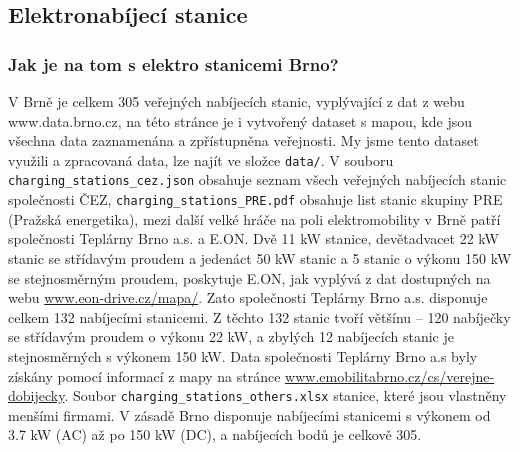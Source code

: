 \documentclass[a4paper,11pt]{article}
\begin{document}
\subsection{Elektronabíjecí stanice}

\subsubsection{Jak je na tom s elektro stanicemi Brno?}
\label{sec:stanice}
V Brně je celkem 305 veřejných nabíjecích stanic, vyplývající z dat z webu www.data.brno.cz\cite{data_brno},
na této stránce je i vytvořený dataset s mapou, kde jsou všechna data zaznamenána a zpřístupněna veřejnosti.
My jsme tento dataset využili a zpracovaná data, lze najít ve složce \texttt{data/}. V souboru \texttt{charging\_stations\_cez.json}
obsahuje seznam všech veřejných nabíjecích stanic společnosti ČEZ, \texttt{charging\_stations\_PRE.pdf} obsahuje
list stanic skupiny PRE (Pražská energetika), mezi další velké hráče na poli elektromobility v Brně patří společnosti
Teplárny Brno a.s. a E.ON. Dvě 11 kW stanice, devětadvacet 22 kW stanic se střídavým proudem a jedenáct 50 kW stanic 
a 5 stanic o výkonu 150 kW se stejnosměrným proudem, poskytuje E.ON, jak vyplývá z dat dostupných na webu 
\href{https://www.eon-drive.cz/mapa/}{www.eon-drive.cz/mapa/}. Zato společnosti Teplárny Brno a.s. disponuje celkem 
132 nabíjecími stanicemi. Z těchto 132 stanic tvoří většínu -- 120 nabíječky se střídavým proudem o výkonu 22 kW, 
a zbylých 12 nabíjecích stanic je stejnosměrných s výkonem 150 kW. Data společnosti Teplárny Brno a.s byly získány pomocí informací 
z mapy na stránce \href{https://www.emobilitabrno.cz/cs/verejne-dobijecky}{www.emobilitabrno.cz/cs/verejne-dobijecky}.
Soubor \texttt{charging\_stations\_others.xlsx} stanice, které jsou vlastněny menšími firmami.
V zásadě Brno disponuje nabíjecími stanicemi s výkonem od 3.7 kW (AC) až po 150 kW (DC), a nabíjecích bodů je 
celkově 305. \cite{eon_data, emobilita_data}

\end{document}
